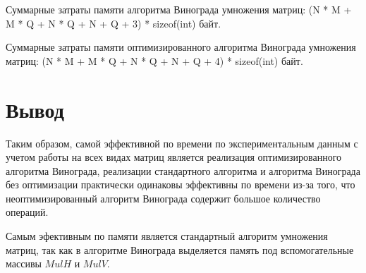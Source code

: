 Суммарные затраты памяти алгоритма Винограда умножения матриц:
(N * M + M * Q + N * Q + N + Q + 3) * sizeof(int) байт.

Суммарные затраты памяти оптимизированного алгоритма Винограда умножения матриц:
(N * M + M * Q + N * Q + N + Q + 4) * sizeof(int) байт.

\section*{Вывод}

Таким образом, самой эффективной по времени по экспериментальным данным с учетом работы на всех видах матриц является реализация оптимизированного алгоритма Винограда, реализации стандартного алгоритма и алгоритма Винограда без оптимизации практически одинаковы эффективны по времени из-за того, что неоптимизированный алгоритм Винограда содержит большое количество операций. 

Самым эфективным по памяти является стандартный алгоритм умножения матриц, так как в алгоритме Винограда выделяется память под вспомогательные массивы $MulH$ и $MulV$.
